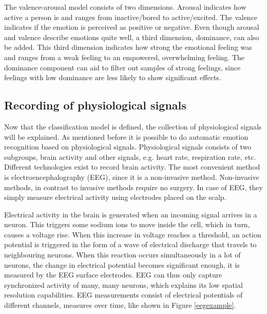 \npar

The valence-arousal model consists of two dimensions. Arousal indicates how active a person is and ranges from inactive/bored to active/excited. The valence indicates if the emotion is perceived as positive or negative. Even though arousal and valence describe emotions quite well, a third dimension, dominance, can also be added. This third dimension indicates how strong the emotional feeling was and ranges from a weak feeling to an empowered, overwhelming feeling. The dominance component can aid to filter out samples of strong feelings, since feelings with low dominance are less likely to show significant effects.


\subsection{Recording of physiological signals}

Now that the classification model is defined, the collection of physiological signals will be explained. As mentioned before it is possible to do automatic emotion recognition based on physiological signals. Physiological signals consists of two subgroups, brain activity and other signals, e.g. heart rate, respiration rate, etc. Different technologies exist to record brain activity. The most convenient method is electroencephalography (EEG), since it is a non-invasive method. Non-invasive methods, in contrast to invasive methods require no surgery. In case of EEG, they simply measure electrical activity using electrodes placed on the scalp.

\npar

Electrical activity in the brain is generated when an incoming signal arrives in a neuron. This triggers some sodium ions to move inside the cell, which in turn, causes a voltage rise\cite{ExtendedPaper}. When this increase in voltage reaches a threshold, an action potential is triggered in the form of a wave of electrical discharge that travels to neighbouring neurons. When this reaction occurs simultaneously in a lot of neurons, the change in electrical potential becomes significant enough, it is measured by the EEG surface electrodes. EEG can thus only capture synchronized activity of many, many neurons\cite{ExtendedPaper}, which explains its low spatial resolution capabilities. EEG measurements consist of electrical potentials of different channels, measures over time, like shown in Figure \ref{eegexample}.

